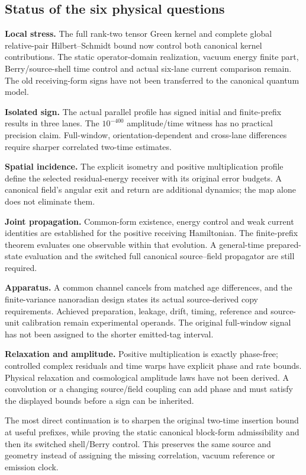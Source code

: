 \subsection{Status of the six physical questions}
\textbf{Local stress.} The full rank-two tensor Green kernel and complete
global relative-pair Hilbert--Schmidt bound now control both canonical
kernel contributions. The static operator-domain realization, vacuum energy
finite part, Berry/source-shell time control and actual six-lane current
comparison remain. The old receiving-form signs have not been transferred
to the canonical quantum model.

\textbf{Isolated sign.} The actual parallel profile has signed initial and
finite-prefix results in three lanes. The $10^{-400}$ amplitude/time witness
has no practical precision claim. Full-window, orientation-dependent and
cross-lane differences require sharper correlated two-time estimates.

\textbf{Spatial incidence.} The explicit isometry and positive multiplication
profile define the selected residual-energy receiver with its original error
budgets. A canonical field's angular exit and return are additional dynamics;
the map alone does not eliminate them.

\textbf{Joint propagation.} Common-form existence, energy control and weak
current identities are established for the positive receiving Hamiltonian.
The finite-prefix theorem evaluates one observable within that evolution.
A general-time prepared-state evaluation and the switched full canonical
source--field propagator are still required.

\textbf{Apparatus.} A common channel cancels from matched age differences,
and the finite-variance nanoradian design states its actual source-derived
copy requirements. Achieved preparation, leakage, drift, timing, reference
and source-unit calibration remain experimental operands. The original
full-window signal has not been assigned to the shorter emitted-tag interval.

\textbf{Relaxation and amplitude.} Positive multiplication is exactly
phase-free; controlled complex residuals and time warps have explicit phase
and rate bounds. Physical relaxation and cosmological amplitude laws have
not been derived. A convolution or a changing source/field coupling can add
phase and must satisfy the displayed bounds before a sign can be inherited.

The most direct continuation is to sharpen the original two-time insertion
bound at useful prefixes, while proving the static canonical block-form
admissibility and then its switched shell/Berry control. This preserves the
same source and geometry instead of assigning the missing correlation,
vacuum reference or emission clock.
